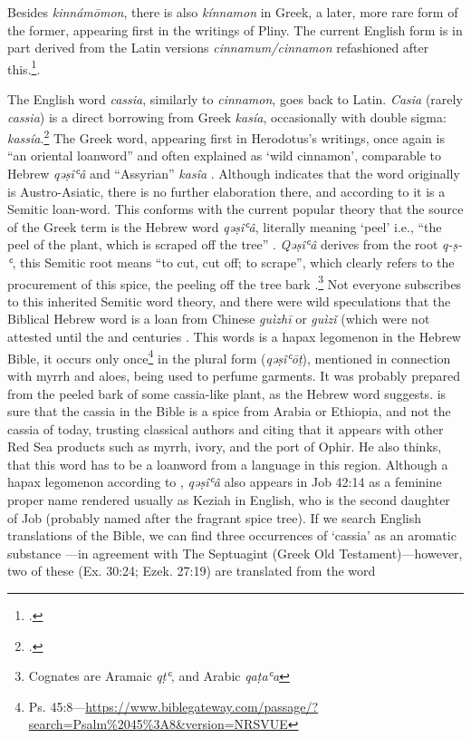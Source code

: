 Besides \textit{kinnámōmon}, there is also  \textit{kínnamon} in Greek, a later, more rare form of the former, appearing first in the writings of Pliny. The current English form is in part derived from the Latin versions \textit{cinnamum/cinnamon} refashioned after this.\footcite[cinnamon]{hoad_concise_2003}.



The English word \textit{cassia}, similarly to \textit{cinnamon}, goes back to Latin. \textit{Casia} (rarely \textit{cassia}) is a direct borrowing from Greek  \textit{kasía}, occasionally with double sigma:  \textit{kassía}.\footcite[s.v. cassia]{oed} The Greek word, appearing first in Herodotus's writings, once again is ``an oriental loanword'' and often explained as `wild cinnamon', comparable to Hebrew  \textit{qəṣîʿâ} and ``Assyrian'' \textit{kasîa} \autocite[653]{beekes_etymological_2010}. Although \textcite{beekes_etymological_2010} indicates that the word originally is Austro-Asiatic, there is no further elaboration there, and according to \textcite[342]{welles_royal_1934} it is a Semitic loan-word. This conforms with the current popular theory that the source of the Greek term is the Hebrew word \textit{qəṣîʿâ}, literally meaning `peel' i.e., ``the peel of the plant, which is scraped off the tree'' \autocite[589]{klein_comprehensive_1987}. \textit{Qəṣîʿâ} derives from the root \textit{q-ṣ-ʿ}, this Semitic root means ``to cut, cut off; to scrape'', which clearly refers to the procurement of this spice, the peeling off the tree bark \autocite{klein_comprehensive_1987}.\footnote{Cognates are Aramaic 
\textit{qṭʿ}, and Arabic 
\textit{qaṭaʿa}} Not everyone subscribes to this inherited Semitic word theory, and there were wild speculations that the Biblical Hebrew word is a loan from Chinese  \textit{guìzhī} or  \textit{guìzǐ} (which were not attested until the  and  centuries \autocite[197]{noonan_non-semitic_2019}. This words is a hapax legomenon in the Hebrew Bible, it occurs only once\footnote{Ps. 45:8---\url{https://www.biblegateway.com/passage/?search=Psalm\%2045\%3A8&version=NRSVUE}} in the plural form (\textit{qəṣîʿōṯ}), mentioned in connection with myrrh and aloes, being used to perfume garments. It was probably prepared from the peeled bark of some cassia-like plant, as the Hebrew word suggests. \autocite[196]{noonan_non-semitic_2019} is sure that the cassia in the Bible is a spice from Arabia or Ethiopia, and not the cassia of today, trusting classical authors and citing that it appears with other Red Sea products such as myrrh, ivory, and the port of Ophir. He also thinks, that this word has to be a loanword from a language in this region. Although a hapax legomenon according to \textcite{klein_comprehensive_1987}, \textit{qəṣîʿâ} also appears in Job 42:14 as a feminine proper name rendered usually as Keziah in English, who is the second daughter of Job (probably named after the fragrant spice tree). If we search English translations of the Bible, we can find three occurrences of `cassia' as an aromatic substance ---in agreement with The Septuagint (Greek Old Testament)---however, two of these (Ex. 30:24; Ezek. 27:19) are translated from the word 
